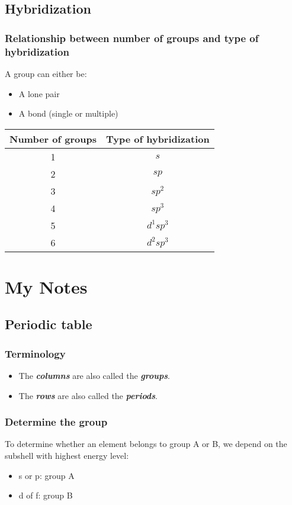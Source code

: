 \documentclass[12pt, a4paper]{report}
\newcommand{\impt}[1]{\textbf{\textit{#1}}}
\newcommand{\hi}{\section}
\newcommand{\hii}{\subsection}
\begin{document}
\hi{Hybridization}
    \hii{Relationship between number of groups and type of hybridization}
        \par A group can either be:
        \begin{itemize}
            \item A lone pair
            \item A bond (single or multiple)
        \end{itemize}
        \begin{center}
            \begin{tabular}{|c|c|}
                \hline
                Number of groups & Type of hybridization \\
                \hline
                1 & $s$ \\
                \hline
                2 & $sp$ \\
                \hline
                3 & $sp^{2}$ \\
                \hline
                4 & $sp^{3}$ \\
                \hline
                5 & $d^{1}sp^{3}$ \\
                \hline
                6 & $d^{2}sp^{3}$ \\
                \hline
            \end{tabular}
        \end{center}

\chapter{My Notes}

\hi{Periodic table}
    \hii{Terminology}
        \begin{itemize}
            \item The \impt{columns} are also called the \impt{groups}.
            \item The \impt{rows} are also called the \impt{periods}.
        \end{itemize}

    \hii{Determine the group}
        \par To determine whether an element belongs to group A or B, we depend on the subshell with
        highest energy level:
        \begin{itemize}
            \item s or p: group A
            \item d of f: group B
        \end{itemize}
\end{document}
